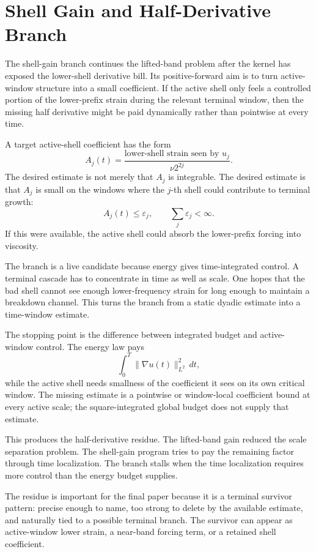 \section{Shell Gain and Half-Derivative Branch}
\label{sec:shell-gain-half-derivative-branch}

The shell-gain branch continues the lifted-band problem after the kernel has
exposed the lower-shell derivative bill. Its positive-forward aim is to turn
active-window structure into a small coefficient. If the active shell only feels
a controlled portion of the lower-prefix strain during the relevant terminal
window, then the missing half derivative might be paid dynamically rather than
pointwise at every time.

A target active-shell coefficient has the form
\[
  A_j(t)=\frac{\text{lower-shell strain seen by }u_j}{\nu 2^{2j}}.
\]
The desired estimate is not merely that \(A_j\) is integrable. The desired
estimate is that \(A_j\) is small on the windows where the \(j\)-th shell could
contribute to terminal growth:
\[
  A_j(t)\leq \varepsilon_j,
  \qquad \sum_j \varepsilon_j<\infty.
\]
If this were available, the active shell could absorb the lower-prefix forcing
into viscosity.

The branch is a live candidate because energy gives time-integrated control. A terminal
cascade has to concentrate in time as well as scale. One hopes that the bad shell
cannot see enough lower-frequency strain for long enough to maintain a breakdown
channel. This turns the branch from a static dyadic estimate into a time-window
estimate.

The stopping point is the difference between integrated budget and active-window
control. The energy law pays
\[
  \int_0^T \|\nabla u(t)\|_{L^2}^2\,dt,
\]
while the active shell needs smallness of the coefficient it sees on its own
critical window. The missing estimate is a pointwise or window-local
coefficient bound at every active scale; the square-integrated global budget
does not supply that estimate.

This produces the half-derivative residue. The lifted-band gain reduced the
scale separation problem. The shell-gain program tries to pay the remaining
factor through time localization. The branch stalls when the time localization
requires more control than the energy budget supplies.

The residue is important for the final paper because it is a terminal survivor
pattern: precise enough to name, too strong to delete by the available estimate,
and naturally tied to a possible terminal branch. The survivor can appear as
active-window lower strain, a near-band forcing term, or a retained shell
coefficient.

